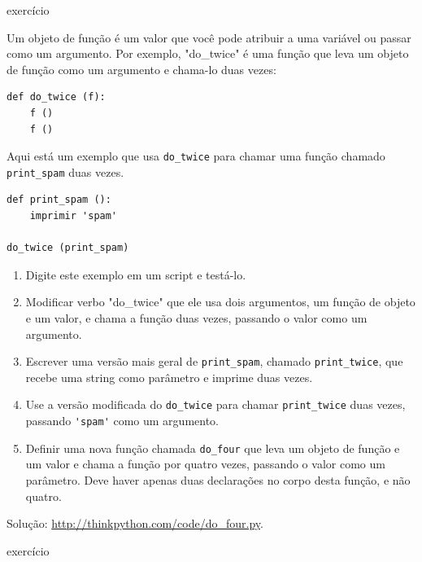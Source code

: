 \documentclass[10pt]{book}
\begin{document}
\begin{} exercício

Um objeto de função é um valor que você pode atribuir a uma variável
ou passar como um argumento. Por exemplo, \verbo "do_twice" é uma função
que leva um objeto de função como um argumento e chama-lo duas vezes:

\begin{verbatim}
def do_twice (f):
    f ()
    f ()
\end{verbatim}

Aqui está um exemplo que usa \verb "do_twice" para chamar uma função
chamado \verb "print_spam" duas vezes.

\begin{verbatim}
def print_spam ():
    imprimir 'spam'

do_twice (print_spam)
\end{verbatim}

\begin{enumerate}

\item Digite este exemplo em um script e testá-lo.

\item Modificar verbo "do_twice" \para que ele usa dois argumentos, um
função de objeto e um valor, e chama a função duas vezes,
passando o valor como um argumento.

\item Escrever uma versão mais geral de \verb "print_spam", chamado
\Verb "print_twice", que recebe uma string como parâmetro e imprime
duas vezes.

\item Use a versão modificada do \verb "do_twice" para chamar
\Verb "print_twice" duas vezes, passando \verb "'spam'" como um argumento.

\item Definir uma nova função chamada 
\Verb "do_four" que leva um objeto de função e um valor
e chama a função por quatro vezes, passando o valor
como um parâmetro. Deve haver apenas
duas declarações no corpo desta função, e não quatro.

\end{enumerate}

Solução: \url{http://thinkpython.com/code/do_four.py}.

\end{} exercício
\end{document}
